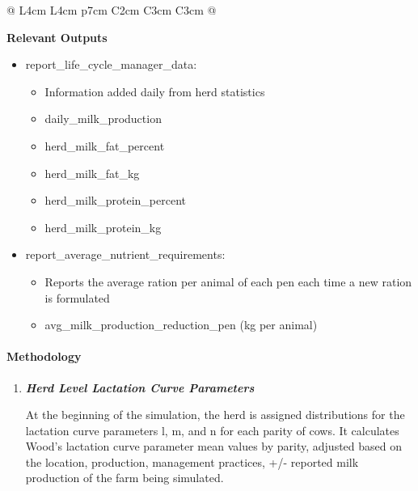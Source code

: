 \begin{refsection}
\begin{landscape}
\begin{longtable}{@{} L{4cm} L{4cm} p{7cm} C{2cm} C{3cm} C{3cm} @{}}
\end{longtable}

\end{landscape}



\textbf{Relevant Outputs}
\vspace{-0.25cm}

    \begin{itemize}
        \item report\_life\_cycle\_manager\_data:	
        \begin{itemize}
            \item Information added daily from herd statistics
            \item daily\_milk\_production 
            \item herd\_milk\_fat\_percent
            \item herd\_milk\_fat\_kg
            \item herd\_milk\_protein\_percent 
            \item herd\_milk\_protein\_kg
        \end{itemize}

        \item report\_average\_nutrient\_requirements: 
        \begin{itemize}
            \item Reports the average ration per animal of each pen each time a new ration is formulated 
            \item avg\_milk\_production\_reduction\_pen (kg per animal)
        \end{itemize}
    \end{itemize}


    \paragraph{Methodology}
    \begin{enumerate}

        \item \textbf{\textit{Herd Level Lactation Curve Parameters}} 
        \vspace{0.1cm}
        
        At the beginning of the simulation, the herd is assigned distributions for the lactation curve parameters l, m, and n for each parity of cows. It calculates Wood’s lactation curve parameter mean values by parity, adjusted based on the location, production, management practices, +/- reported milk production of the farm being simulated. 
         \vspace{0.1cm}


\end{enumerate}
\end{refsection}
